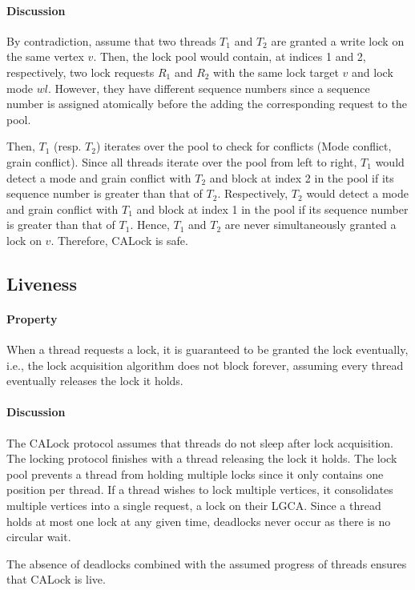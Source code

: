 \paragraph{Discussion} By contradiction, assume that two threads $T_1$ and $T_2$ are granted a write lock on the same vertex $v$. 
Then, the lock pool would contain, at indices 1 and 2, respectively, two lock requests $R_1$ and $R_2$ with the same lock target $v$ and lock mode $wl$. However, they have different sequence numbers since a sequence number is assigned atomically before the adding the corresponding request to the pool.

Then, $T_1$ (resp. $T_2$) iterates over the pool to check for conflicts (Mode conflict, grain conflict). 
Since all threads iterate over the pool from left to right, $T_1$ would detect a mode and grain conflict with $T_2$ and block at index 2 in the pool if its sequence number is greater than that of $T_2$. Respectively, $T_2$ would detect a mode and grain conflict with $T_1$ and block at index 1 in the pool if its sequence number is greater than that of $T_1$.
Hence, $T_1$ and $T_2$ are never simultaneously granted a lock on $v$. Therefore, CALock is safe.

\subsection[Liveness]{Liveness}
\paragraph{Property} When a thread requests a lock, it is guaranteed to be granted the lock eventually, i.e., 
the lock acquisition algorithm does not block forever, assuming every thread eventually releases the lock it holds.

\paragraph{Discussion}
The CALock protocol assumes that threads do not sleep after lock acquisition. The locking protocol finishes with a thread releasing the lock it holds. The lock pool prevents a thread from holding multiple locks since it only contains one position per thread. 
If a thread wishes to lock multiple vertices, it consolidates multiple vertices into a single request, a lock on their LGCA. 
Since a thread holds at most one lock at any given time, deadlocks never occur as there is no circular wait.

The absence of deadlocks combined with the assumed progress of threads ensures that CALock is live. 

